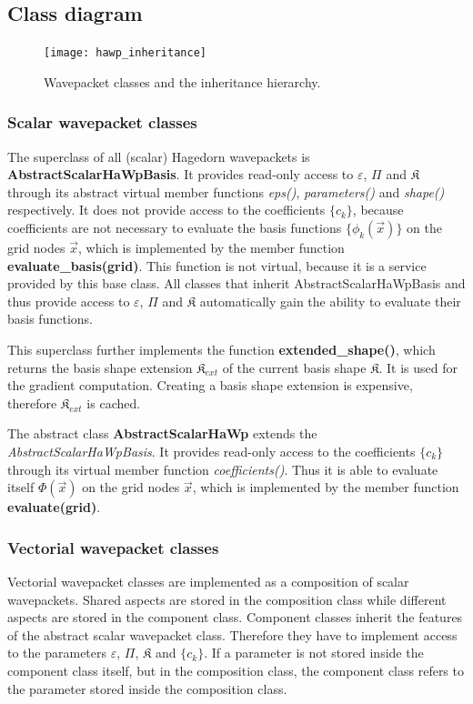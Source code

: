 \documentclass{article}
\def\classname#1{\textit{#1}}
\begin{document}
\subsection{Class diagram}

\begin{figure}[H]
  \centering
  \texttt{[image: hawp\_inheritance]}
  \caption{Wavepacket classes and the inheritance hierarchy.}
  \label{fig:hawp_inheritance}
\end{figure}

\subsubsection{Scalar wavepacket classes}

The superclass of all (scalar) Hagedorn wavepackets is \textbf{AbstractScalarHaWpBasis}.
It provides read-only access to \(\varepsilon\), \(\Pi\) and \(\mathfrak{K}\)
through its abstract virtual member functions \emph{eps()}, \emph{parameters()} and \emph{shape()}
respectively. It does not provide access to the coefficients \(\{c_k\}\), because coefficients
are not necessary to evaluate the basis functions \(\{\phi_k(\vec{x})\}\) on the grid nodes \(\vec{x}\),
which is implemented by the member function \textbf{evaluate\_basis(grid)}.
This function is not virtual, because it is a service provided by this base class.
All classes that inherit AbstractScalarHaWpBasis and thus provide access to \(\varepsilon\),
\(\Pi\) and \(\mathfrak{K}\) automatically gain the ability to evaluate their basis functions.

This superclass further implements the function \textbf{extended\-\_shape()},
which returns the basis shape extension \(\mathfrak{K}_{ext}\)
of the current basis shape \(\mathfrak{K}\). It is used for the gradient computation.
Creating a basis shape extension is expensive, therefore \(\mathfrak{K}_{ext}\) is cached.

The abstract class \textbf{AbstractScalarHaWp} extends the \classname{AbstractScalarHaWpBasis}.
It provides read-only access to the coefficients \(\{c_k\}\) through its virtual member function
\emph{coefficients()}. Thus it is able to evaluate itself \(\Phi(\vec{x})\) on the grid nodes \(\vec{x}\),
which is implemented by the member function \textbf{evaluate(grid)}.

\subsubsection{Vectorial wavepacket classes}
Vectorial wavepacket classes are implemented as a composition of scalar wave\-packets.
Shared aspects are stored in the composition class while different aspects are
stored in the component class.
Component classes inherit the features of the abstract scalar wavepacket class.
Therefore they have to implement access to the parameters \(\varepsilon\), \(\Pi\), \(\mathfrak{K}\)
and \(\{c_k\}\).
If a parameter is not stored inside the component class itself, but in the composition class,
the component class refers to the parameter stored inside the composition class.
\end{document}
